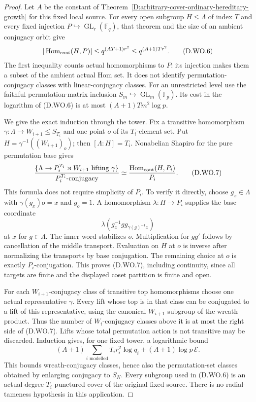 \begin{proof}
Let $A$ be the constant of
Theorem~\ref{D:arbitrary-cover-ordinary-hereditary-growth}
for this fixed local source. For every open subgroup
$H\le\Lambda$ of index $T$ and every fixed injection
$P\hookrightarrow\operatorname{GL}_r(\mathbb F_q)$,
that theorem and the size of an ambient conjugacy orbit give
\[
 |\operatorname{Hom}_{\rm cont}(H,P)|
       \le q^{(AT+1)r^2}\le q^{(A+1)Tr^2}.              \tag{D.WO.6}
\]
The first inequality counts actual homomorphisms to $P$:
its injection makes them a subset of the ambient actual
Hom set. It does not identify permutation-conjugacy classes
with linear-conjugacy classes. For an unrestricted level
use the faithful permutation-matrix inclusion
$S_m\hookrightarrow\operatorname{GL}_m(\mathbb F_p)$.
Its cost in the logarithm of (D.WO.6) is at most
$(A+1)T m^2\log p$.

We give the exact induction through the tower. Fix a
transitive homomorphism
$\gamma:\Lambda\to W_{i+1}\le S_{T_i}$ and one point
$o$ of its $T_i$-element set. Put
$H=\gamma^{-1}((W_{i+1})_o)$; then $[\Lambda:H]=T_i$.
Nonabelian Shapiro for the pure permutation base gives
\[
 \frac{\{\Lambda\to P_i^{T_i}\rtimes W_{i+1}
                       \text{ lifting }\gamma\}}
           {P_i^{T_i}\text{-conjugacy}}
       \simeq
       \frac{\operatorname{Hom}_{\rm cont}(H,P_i)}{P_i}.
                                                        \tag{D.WO.7}
\]
This formula does not require simplicity of $P_i$.
To verify it directly, choose $g_x\in\Lambda$ with
$\gamma(g_x)o=x$ and $g_o=1$. A homomorphism
$\lambda:H\to P_i$ supplies the base coordinate
\[
                 \lambda(g_x^{-1}g g_{\gamma(g)^{-1}x})
                                                        \tag{D.WO.8}
\]
at $x$ for $g\in\Lambda$. The inner word stabilizes $o$.
Multiplication for $g g'$ follows by cancellation of the
middle transport. Evaluation on $H$ at $o$ is inverse
after normalizing the transports by base conjugation.
The remaining choice at $o$ is exactly $P_i$-conjugation.
This proves (D.WO.7), including continuity, since all
targets are finite and the displayed coset partition is
finite and open.

For each $W_{i+1}$-conjugacy class of transitive top
homomorphisms choose one actual representative $\gamma$.
Every lift whose top is in that class can be conjugated
to a lift of this representative, using the canonical
$W_{i+1}$ subgroup of the wreath product. Thus the number
of $W_i$-conjugacy classes above it is at most the right
side of (D.WO.7). Lifts whose total permutation action is
not transitive may be discarded. Induction gives, for
one fixed tower, a logarithmic bound
\[
 (A+1)\sum_{i\text{ modelled}}
                  T_i r_i^2\log q_i
       +(A+1)\log p\,\mathcal E.                       \tag{D.WO.9}
\]
This bounds wreath-conjugacy classes, hence also the
permutation-set classes obtained by enlarging conjugacy
to $S_N$. Every subgroup used in (D.WO.6) is an actual
degree-$T_i$ punctured cover of the original fixed source.
There is no radial-tameness hypothesis in this application.


\end{proof}

